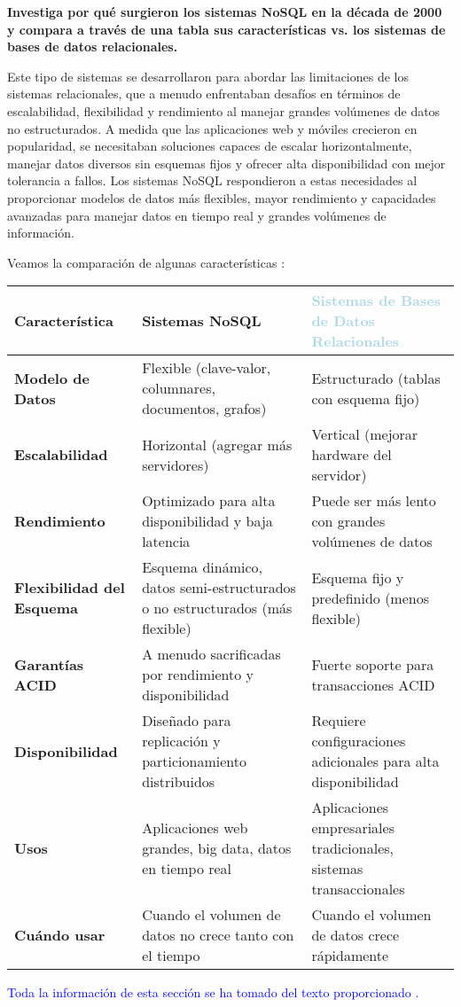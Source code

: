 \begin{center}
\textbf{Investiga por qué surgieron los sistemas NoSQL en la década de 2000 y compara a través de una tabla sus características vs. los sistemas de bases de datos relacionales.}
\end{center}

 Este tipo de sistemas se desarrollaron para abordar las limitaciones de los sistemas relacionales, que a menudo enfrentaban desafíos en términos de escalabilidad, flexibilidad y rendimiento al manejar grandes volúmenes de datos no estructurados. A medida que las aplicaciones web y móviles crecieron en popularidad, se necesitaban soluciones capaces de escalar horizontalmente, manejar datos diversos sin esquemas fijos y ofrecer alta disponibilidad con mejor tolerancia a fallos. Los sistemas NoSQL respondieron a estas necesidades al proporcionar modelos de datos más flexibles, mayor rendimiento y capacidades avanzadas para manejar datos en tiempo real y grandes volúmenes de información.

 Veamos la comparación de algunas características :

 \begin{table}[h!]
\centering
\small 
\begin{tabularx}{\textwidth}{|X|X|X|}
\hline
\textbf{Característica} & \textbf{\textcolor{myPurple}{Sistemas NoSQL}} & \textbf{\textcolor{lightblue}{Sistemas de Bases de Datos Relacionales}} \\
\hline
\textbf{Modelo de Datos} & Flexible (clave-valor, columnares, documentos, grafos) & Estructurado (tablas con esquema fijo) \\
\hline
\textbf{Escalabilidad} & Horizontal (agregar más servidores) & Vertical (mejorar hardware del servidor) \\
\hline
\textbf{Rendimiento} & Optimizado para alta disponibilidad y baja latencia & Puede ser más lento con grandes volúmenes de datos \\
\hline
\textbf{Flexibilidad del Esquema} & Esquema dinámico, datos semi-estructurados o no estructurados (más flexible) & Esquema fijo y predefinido (menos flexible) \\
\hline
\textbf{Garantías ACID} & A menudo sacrificadas por rendimiento y disponibilidad & Fuerte soporte para transacciones ACID \\
\hline
\textbf{Disponibilidad} & Diseñado para replicación y particionamiento distribuidos & Requiere configuraciones adicionales para alta disponibilidad \\
\hline
\textbf{Usos} & Aplicaciones web grandes, big data, datos en tiempo real & Aplicaciones empresariales tradicionales, sistemas transaccionales \\
\hline
\textbf{Cuándo usar} & Cuando el volumen de datos no crece tanto con el tiempo & Cuando el volumen de datos crece rápidamente \\
\hline
\end{tabularx}
\label{tab:nosql_vs_rdbms}
\end{table}

\textcolor{blue}{Toda la información de esta sección se ha tomado del texto proporcionado \cite{nosql}.} \\
